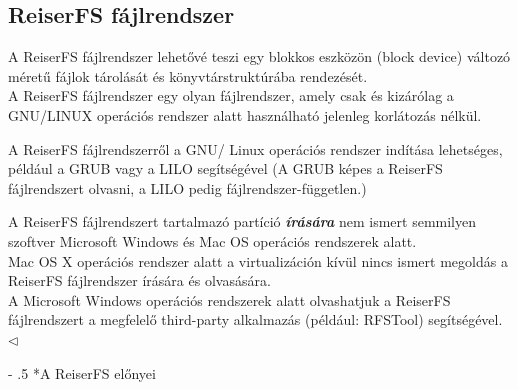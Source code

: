 \documentclass[tikz,12pt,margin=0px]{article}
\makeatletter
\renewcommand\paragraph{%
	\@startsection{paragraph}{4}{0mm}%
	{-\baselineskip}%
	{.5\baselineskip}%
	{\normalfont\normalsize\bfseries}}
\makeatother
\begin{document}
	\subsection*{ReiserFS fájlrendszer\\}

    \noindent A ReiserFS fájlrendszer lehetővé teszi egy blokkos eszközön (block device) változó méretű fájlok tárolását és könyvtárstruktúrába rendezését.\\

    \noindent A ReiserFS fájlrendszer egy olyan fájlrendszer, amely csak és kizárólag a GNU/LINUX operációs rendszer alatt használható jelenleg korlátozás nélkül.\\

    {\footnotesize \noindent {\color{blue} \faLightbulbO\ $\triangleright$ } }
    {\footnotesize
    \noindent A ReiserFS fájlrendszerről a GNU/ Linux operációs rendszer indítása lehetséges, például a GRUB vagy a LILO segítségével (A GRUB képes a ReiserFS fájlrendszert olvasni, a LILO pedig fájlrendszer-független.)

    \noindent A ReiserFS fájlrendszert tartalmazó partíció \emph{\textbf{írására}} nem ismert semmilyen szoftver Microsoft Windows és Mac OS operációs rendszerek alatt.\\

    \noindent Mac OS X operációs rendszer alatt a virtualizáción kívül nincs ismert megoldás a ReiserFS fájlrendszer írására és olvasására.\\

    \noindent A Microsoft Windows operációs rendszerek alatt olvashatjuk a ReiserFS fájlrendszert a megfelelő third-party alkalmazás (például: RFSTool) segítségével.
    $\triangleleft$ \faLightbulbO}

    \paragraph*{A ReiserFS előnyei\\}
\end{document}
